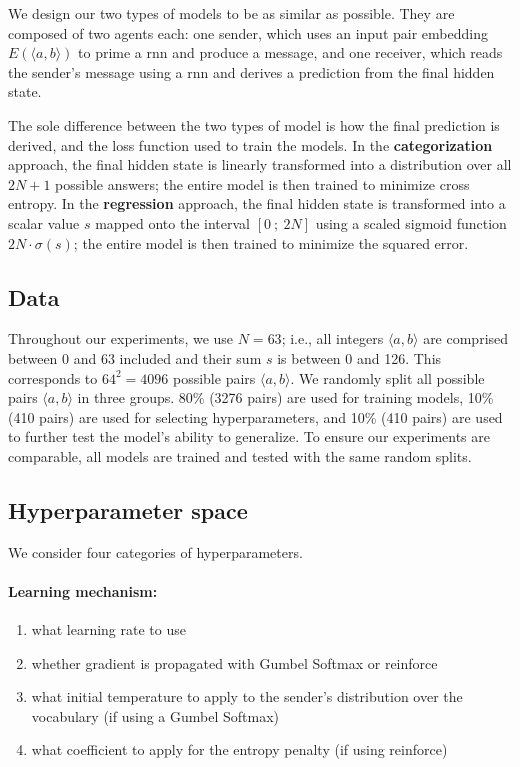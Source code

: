 \documentclass[twocolumn]{article}
\begin{document}
We design our two types of models to be as similar as possible. 
They are composed of two agents each: one sender, which uses an input pair embedding $E(\langle a,b \rangle)$ to prime a {\sc rnn} and produce a message, and one receiver, which reads the sender's message using a {\sc rnn} and derives a prediction from the final hidden state.

The sole difference between the two types of model is how the final prediction is derived, and the loss function used to train the models.
In the \textbf{categorization} approach, the final hidden state is linearly transformed into a distribution over all $2N + 1$ possible answers; the entire model is then trained to minimize cross entropy.
In the \textbf{regression} approach, the final hidden state is transformed into a scalar value $s$ mapped onto the interval $\left[0~; ~2N \right]$ using a scaled sigmoid function $2N\cdot\sigma(s)$; the entire model is then trained to minimize the squared error. 

\subsection{Data} \label{sec:experiment:data}

Throughout our experiments, we use $N=63$; i.e., all integers $\langle a,b \rangle$ are comprised between 0 and 63 included and their sum $s$ is between 0 and 126. 
This corresponds to $64^2=4096$ possible pairs $\langle a,b \rangle$.
We randomly split all possible pairs $\langle a,b \rangle$ in three groups. 80\% (3276 pairs) are used for training models, 10\% (410 pairs) are used for selecting hyperparameters, and 10\% (410 pairs) are used to further test the model's ability to generalize.
To ensure our experiments are comparable, all models are trained and tested with the same random splits.

\subsection{Hyperparameter space} \label{sec:experiment:hparams}

We consider four categories of hyperparameters.

\vspace*{-0.5em}
\paragraph{Learning mechanism:} 
\begin{enumerate}[label=(\roman*)]
    \vspace*{-0.5em}
    \itemsep-0.25em 
    \item what learning rate to use
    \item \label{it:hp:mechanism} whether gradient is propagated with Gumbel Softmax or {\sc reinforce}
    \item \label{it:hp:temp} what initial temperature to apply to the sender's distribution over the vocabulary (if using a Gumbel Softmax)
    \item \label{it:hp:entropy} what coefficient to apply for the entropy penalty (if using {\sc reinforce})
\end{enumerate}
\end{document}
